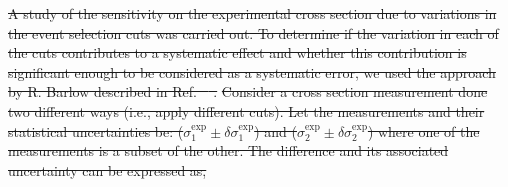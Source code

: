 \documentclass[aps, prl]{revtex4-2}  %
\providecommand{\DIFdeltex}[1]{{\protect\color{red}\sout{#1}}}                      %
\providecommand{\DIFdelbegin}{} %
\providecommand{\DIFdel}[1]{\texorpdfstring{\DIFdeltex{#1}}{}} %
\newcommand{\DIFscaledelfig}{0.5}
\newlength{\DIFdelgraphicswidth} %
\newlength{\DIFdelgraphicsheight} %
\newcommand{\DIFdelincludegraphics}[2][]{%
\sbox{\DIFdelgraphicsbox}{\DIFOincludegraphics[#1]{#2}}%
\settoboxwidth{\DIFdelgraphicswidth}{\DIFdelgraphicsbox} %
\settoboxtotalheight{\DIFdelgraphicsheight}{\DIFdelgraphicsbox} %
\scalebox{\DIFscaledelfig}{%
\parbox[b]{\DIFdelgraphicswidth}{\usebox{\DIFdelgraphicsbox}\\[-\baselineskip] \rule{\DIFdelgraphicswidth}{0em}}\llap{\resizebox{\DIFdelgraphicswidth}{\DIFdelgraphicsheight}{%
\setlength{\unitlength}{\DIFdelgraphicswidth}%
\begin{picture}(1,1)%
\thicklines\linethickness{2pt} %
{\color[rgb]{1,0,0}\put(0,0){\framebox(1,1){}}}%
{\color[rgb]{1,0,0}\put(0,0){\line( 1,1){1}}}%
{\color[rgb]{1,0,0}\put(0,1){\line(1,-1){1}}}%
\end{picture}%
}\hspace*{3pt}}} %
} %
\DeclareRobustCommand{\DIFdelbegin}{\DIFOdelbegin \let\includegraphics\DIFdelincludegraphics} %
\begin{document}
\indent \DIFdelbegin \DIFdel{A study of the sensitivity on the experimental cross section due to variations in the event selection cuts was carried out. 
To determine if the variation in each of the cuts contributes to a systematic effect and whether this contribution is significant
enough to be considered as a systematic error, we used the approach by R. Barlow described in Ref. \mbox{%
\cite{barlow2002systematic}}\hspace{0pt}%
.}%
\DIFdel{Consider a cross section measurement done two different ways (i.e., apply different cuts). Let the measurements and their
statistical uncertainties be: ($\sigma^{\mathrm{exp}}_{\mathrm{1}}\pm\delta\sigma^{\mathrm{exp}}_{\mathrm{1}}$) and ($\sigma^{\mathrm{exp}}_{\mathrm{2}}\pm\delta\sigma^{\mathrm{exp}}_{\mathrm{2}}$)
where one of the measurements is a subset of the other. The difference and its associated uncertainty can be expressed as,
}%
\end{document}
